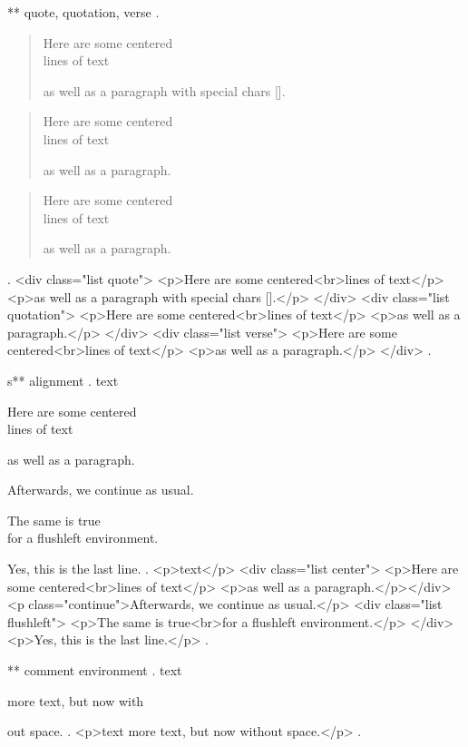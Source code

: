 ** quote, quotation, verse
.
\begin{quote}
    Here are some centered\\
    lines of text

    as well as a paragraph with special chars [].
\end{quote}

\begin{quotation}
    Here are some centered\\
    lines of text

    as well as a paragraph.
\end{quotation}

\begin{verse}
    Here are some centered\\
    lines of text

    as well as a paragraph.
\end{verse}
.
<div class="list quote">
<p>Here are some centered<br>lines of text</p>
<p>as well as a paragraph with special chars [].</p>
</div>
<div class="list quotation">
<p>Here are some centered<br>lines of text</p>
<p>as well as a paragraph.</p>
</div>
<div class="list verse">
<p>Here are some centered<br>lines of text</p>
<p>as well as a paragraph.</p>
</div>
.


s** alignment
.
text
\begin{center}
    Here are some centered\\
    lines of text

    as well as a paragraph.
\end{center}
Afterwards, we continue as usual.
\begin{flushleft}
    The same is true\\
    for a flushleft environment.
\end{flushleft}

Yes, this is the last line.
.
<p>text</p>
<div class="list center">
<p>Here are some centered<br>lines of text</p>
<p>as well as a paragraph.</p></div>
<p class="continue">Afterwards, we continue as usual.</p>
<div class="list flushleft">
<p>The same is true<br>for a ﬂushleft environment.</p>
</div>
<p>Yes, this is the last line.</p>
.



** comment environment
.
text
\begin{comment}
    This is a comment.
    \end{comment
    still more comment.
\end{comment}
more text, but now with%
\begin{comment}
    This is a comment.
\end{comment}
out space.
.
<p>text more text, but now without space.</p>
.